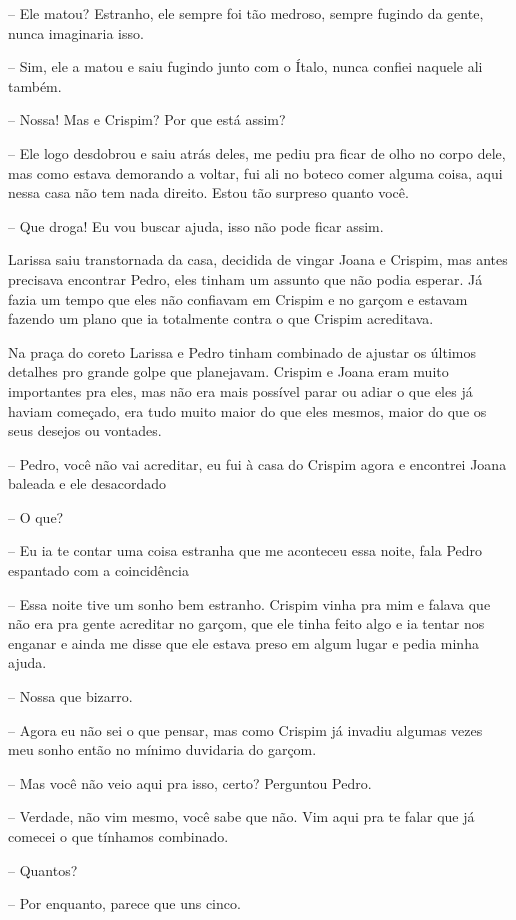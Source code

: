 -- Ele matou? Estranho, ele sempre foi tão medroso, sempre fugindo da gente, nunca imaginaria isso.

-- Sim, ele a matou e saiu fugindo junto com o Ítalo, nunca confiei naquele ali também.

-- Nossa! Mas e Crispim? Por que está assim?

-- Ele logo desdobrou e saiu atrás deles, me pediu pra ficar de olho no corpo dele, mas como estava demorando a voltar, fui ali no boteco comer alguma coisa, aqui nessa casa não tem nada direito. Estou tão surpreso quanto você.

-- Que droga! Eu vou buscar ajuda, isso não pode ficar assim.

Larissa saiu transtornada da casa, decidida de vingar Joana e Crispim, mas antes precisava encontrar Pedro, eles tinham um assunto que não podia esperar. Já fazia um tempo que eles não confiavam em Crispim e no garçom e estavam fazendo um plano que ia totalmente contra o que Crispim acreditava.

Na praça do coreto Larissa e Pedro tinham combinado de ajustar os últimos detalhes pro grande golpe que planejavam. Crispim e Joana eram muito importantes pra eles, mas não era mais possível parar ou adiar o que eles já haviam começado, era tudo muito maior do que eles mesmos, maior do que os seus desejos ou vontades.

-- Pedro, você não vai acreditar, eu fui à casa do Crispim agora e encontrei Joana baleada e ele desacordado

-- O que?

-- Eu ia te contar uma coisa estranha que me aconteceu essa noite, fala Pedro espantado com a coincidência

-- Essa noite tive um sonho bem estranho. Crispim vinha pra mim e falava que não era pra gente acreditar no garçom, que ele tinha feito algo e ia tentar nos enganar e ainda me disse que ele estava preso em algum lugar e pedia minha ajuda.

-- Nossa que bizarro.

-- Agora eu não sei o que pensar, mas como Crispim já invadiu algumas vezes meu sonho então no mínimo duvidaria do garçom.

-- Mas você não veio aqui pra isso, certo? Perguntou Pedro.

-- Verdade, não vim mesmo, você sabe que não. Vim aqui pra te falar que já comecei o que tínhamos combinado.

-- Quantos?

-- Por enquanto, parece que uns cinco.

